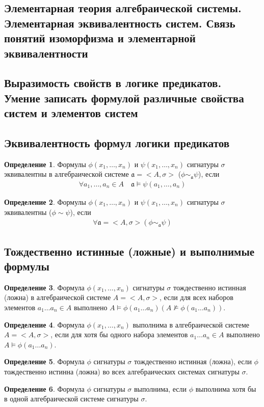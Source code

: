 \documentclass[a4paper]{article}
\theoremstyle{definition}
\newtheorem*{definition}{Определение}
\theoremstyle{remark}
\begin{document}
    \subsection{Элементарная теория алгебраической системы. Элементарная эквивалентность систем. Связь понятий изоморфизма и элементарной эквивалентности}
    \subsection{Выразимость свойств в логике предикатов. Умение записать формулой различные свойства систем и элементов систем}
    \subsection{Эквивалентность формул логики предикатов}
    \begin{definition}
        Формулы $\phi(x_1, \dots, x_n)$ и $\psi(x_1, \dots, x_n)$ сигнатуры $\sigma$ эквивалентны
        в алгебраической системе $\mathfrak{a} = <A, \sigma>$ ($\phi \sim_\mathfrak{a} \psi$), если
        \begin{align*}
            \forall a_1, \dots, a_n\in A\quad\mathfrak{a}\models \psi(a_1, \dots, a_n)
        \end{align*}
    \end{definition}
    \begin{definition}
        Формулы $\phi(x_1, \dots, x_n)$ и $\psi(x_1, \dots, x_n)$ сигнатуры $\sigma$ эквивалентны
        ($\phi \sim  \psi$), если
        \begin{align*}
            \forall \mathfrak{a} = <A, \sigma> (\phi \sim_\mathfrak{a} \psi)
        \end{align*}
    \end{definition}
    \subsection{Тождественно истинные (ложные) и выполнимые формулы}
    \begin{definition}
        Формула $\phi(x_1, \dots, x_n)$ сигнатуры $\sigma$ тождественно истинная (ложна) в алгебраической 
        системе $A = <A, \sigma>$, если для всех наборов элементов $a_1\dots a_n \in A$ выполнено 
        $A \models \phi(a_1\dots a_n) (A \not\models \phi(a_1\dots a_n)).$
    \end{definition}
    \begin{definition}
        Формула $\phi(x_1, \dots, x_n)$ выполнима в алгебраической системе 
        $A = <A, \sigma>$, если для хотя бы одного набора элементов $a_1\dots a_n \in A $ выполнено 
        $A \models \phi(a_1\dots a_n)$.
    \end{definition}
    \begin{definition}
        Формула $\phi$ сигнатуры $\sigma $ тождественно истинная (ложна), если $\phi$ тождественно истинна 
        (ложна) во всех алгебраических системах сигнатуры $\sigma$. 
    \end{definition}
    \begin{definition}
        Формула $\phi$ сигнатуры $\sigma$ выполнима, 
        если $\phi$ выполнима хотя бы в одной алгебраической системе сигнатуры $\sigma$. 
    \end{definition}
\end{document}
